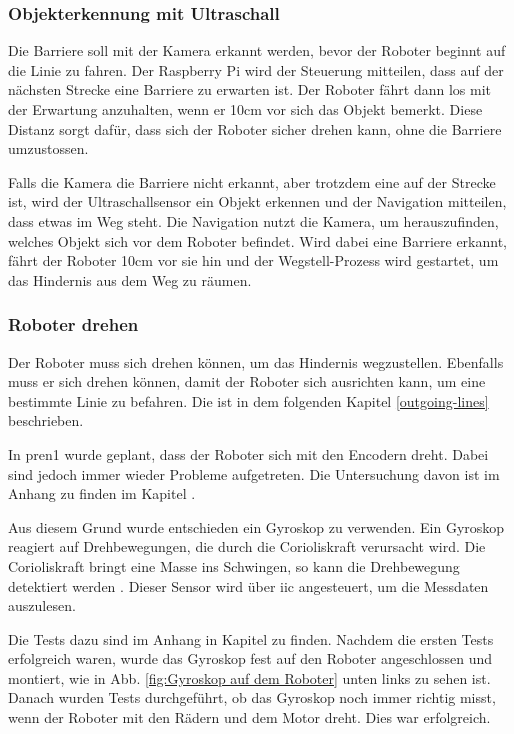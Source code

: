\subsubsection{Objekterkennung mit Ultraschall}

Die Barriere soll mit der Kamera erkannt werden, bevor der Roboter beginnt auf die Linie zu fahren. Der Raspberry Pi wird der Steuerung mitteilen, dass auf der nächsten Strecke eine Barriere zu erwarten ist. Der Roboter fährt dann los mit der Erwartung anzuhalten, wenn er 10cm vor sich das Objekt bemerkt. Diese Distanz sorgt dafür, dass sich der Roboter sicher drehen kann, ohne die Barriere umzustossen.

Falls die Kamera die Barriere nicht erkannt, aber trotzdem eine auf der Strecke ist, wird der Ultraschallsensor ein Objekt erkennen und der Navigation mitteilen, dass etwas im Weg steht. Die Navigation nutzt die Kamera, um herauszufinden, welches Objekt sich vor dem Roboter befindet. Wird dabei eine Barriere erkannt, fährt der Roboter 10cm vor sie hin und der Wegstell-Prozess wird gestartet, um das Hindernis aus dem Weg zu räumen.

\subsubsection{Roboter drehen}

Der Roboter muss sich drehen können, um das Hindernis wegzustellen. Ebenfalls muss er sich drehen können, damit der Roboter sich ausrichten kann, um eine bestimmte Linie zu befahren. Die ist in dem folgenden Kapitel \ref{outgoing-lines} beschrieben.

In \acrshort{pren1} wurde geplant, dass der Roboter sich mit den Encodern dreht. Dabei sind jedoch immer wieder Probleme aufgetreten. Die Untersuchung davon ist im Anhang zu finden im Kapitel .

Aus diesem Grund wurde entschieden ein Gyroskop zu verwenden.
 Ein Gyroskop reagiert auf Drehbewegungen, die durch die Corioliskraft verursacht wird. Die Corioliskraft bringt eine Masse ins Schwingen, so kann die Drehbewegung detektiert werden \parencite{zielke2025}. Dieser Sensor wird über \acrshort{iic} angesteuert, um die Messdaten auszulesen. 

Die Tests dazu sind im Anhang in Kapitel  zu finden. Nachdem die ersten Tests erfolgreich waren, wurde das Gyroskop fest auf den Roboter angeschlossen und montiert, wie in Abb. \ref{fig:Gyroskop auf dem Roboter} unten links zu sehen ist. Danach wurden Tests durchgeführt, ob das Gyroskop noch immer richtig misst, wenn der Roboter mit den Rädern und dem Motor dreht. Dies war erfolgreich.


